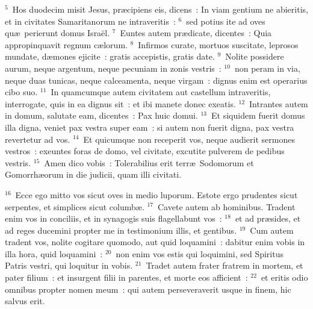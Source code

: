 ${}^{5}$~Hos duodecim misit Jesus, pr\ae cipiens eis, dicens~: In viam gentium ne abieritis, et in civitates Samaritanorum ne intraveritis~:
${}^{6}$~sed potius ite ad oves qu\ae\ perierunt domus Isra\"el.
${}^{7}$~Euntes autem pr\ae dicate, dicentes~: Quia appropinquavit regnum c\ae lorum.
${}^{8}$~Infirmos curate, mortuos suscitate, leprosos mundate, d\ae mones ejicite~: gratis accepistis, gratis date.
${}^{9}$~Nolite possidere aurum, neque argentum, neque pecuniam in zonis vestris~:
${}^{10}$~non peram in via, neque duas tunicas, neque calceamenta, neque virgam~: dignus enim est operarius cibo suo.
${}^{11}$~In quamcumque autem civitatem aut castellum intraveritis, interrogate, quis in ea dignus sit~: et ibi manete donec exeatis.
${}^{12}$~Intrantes autem in domum, salutate eam, dicentes~: Pax huic domui.
${}^{13}$~Et siquidem fuerit domus illa digna, veniet pax vestra super eam~: si autem non fuerit digna, pax vestra revertetur ad vos.
${}^{14}$~Et quicumque non receperit vos, neque audierit sermones vestros~: exeuntes foras de domo, vel civitate, excutite pulverem de pedibus vestris.
${}^{15}$~Amen dico vobis~: Tolerabilius erit terr\ae\ Sodomorum et Gomorrh\ae orum in die judicii, quam illi civitati.


${}^{16}$~Ecce ego mitto vos sicut oves in medio luporum. Estote ergo prudentes sicut serpentes, et simplices sicut columb\ae .
${}^{17}$~Cavete autem ab hominibus. Tradent enim vos in conciliis, et in synagogis suis flagellabunt vos~:
${}^{18}$~et ad pr\ae sides, et ad reges ducemini propter me in testimonium illis, et gentibus.
${}^{19}$~Cum autem tradent vos, nolite cogitare quomodo, aut quid loquamini~: dabitur enim vobis in illa hora, quid loquamini~:
${}^{20}$~non enim vos estis qui loquimini, sed Spiritus Patris vestri, qui loquitur in vobis.
${}^{21}$~Tradet autem frater fratrem in mortem, et pater filium~: et insurgent filii in parentes, et morte eos afficient~:
${}^{22}$~et eritis odio omnibus propter nomen meum~: qui autem perseveraverit usque in finem, hic salvus erit.


